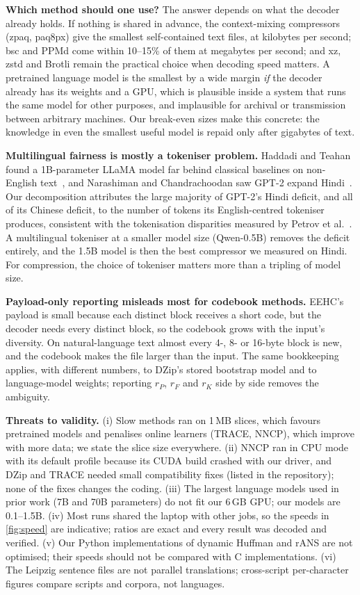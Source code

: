 \textbf{Which method should one use?} The answer depends on what the decoder already holds. If nothing is shared in advance, the context-mixing compressors (zpaq, paq8px) give the smallest self-contained text files, at kilobytes per second; bsc and PPMd come within 10--15\% of them at megabytes per second; and xz, zstd and Brotli remain the practical choice when decoding speed matters. A pretrained language model is the smallest by a wide margin \emph{if} the decoder already has its weights and a GPU, which is plausible inside a system that runs the same model for other purposes, and implausible for archival or transmission between arbitrary machines. Our break-even sizes make this concrete: the knowledge in even the smallest useful model is repaid only after gigabytes of text.

\textbf{Multilingual fairness is mostly a tokeniser problem.} Haddadi and Teahan found a 1B-parameter LLaMA model far behind classical baselines on non-English text~\cite{haddadi2026comparing}, and Narashiman and Chandrachoodan saw GPT-2 expand Hindi~\cite{narashiman2024alphazip}. Our decomposition attributes the large majority of GPT-2's Hindi deficit, and all of its Chinese deficit, to the number of tokens its English-centred tokeniser produces, consistent with the tokenisation disparities measured by Petrov et al.~\cite{petrov2023tokenizers}. A multilingual tokeniser at a smaller model size (Qwen-0.5B) removes the deficit entirely, and the 1.5B model is then the best compressor we measured on Hindi. For compression, the choice of tokeniser matters more than a tripling of model size.

\textbf{Payload-only reporting misleads most for codebook methods.} EEHC's payload is small because each distinct block receives a short code, but the decoder needs every distinct block, so the codebook grows with the input's diversity. On natural-language text almost every 4-, 8- or 16-byte block is new, and the codebook makes the file larger than the input. The same bookkeeping applies, with different numbers, to DZip's stored bootstrap model and to language-model weights; reporting $r_P$, $r_F$ and $r_K$ side by side removes the ambiguity.

\textbf{Threats to validity.}\label{sec:threats}
(i) Slow methods ran on 1\,MB slices, which favours pretrained models and penalises online learners (TRACE, NNCP), which improve with more data; we state the slice size everywhere. (ii) NNCP ran in CPU mode with its default profile because its CUDA build crashed with our driver, and DZip and TRACE needed small compatibility fixes (listed in the repository); none of the fixes changes the coding. (iii) The largest language models used in prior work (7B and 70B parameters) do not fit our 6\,GB GPU; our models are 0.1--1.5B. (iv) Most runs shared the laptop with other jobs, so the speeds in \cref{fig:speed} are indicative; ratios are exact and every result was decoded and verified. (v) Our Python implementations of dynamic Huffman and rANS are not optimised; their speeds should not be compared with C implementations. (vi) The Leipzig sentence files are not parallel translations; cross-script per-character figures compare scripts and corpora, not languages.
